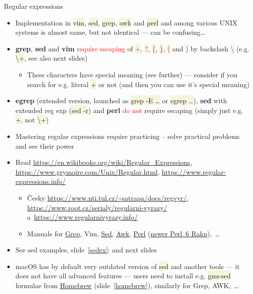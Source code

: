 \documentclass[compress, xelatex, 11pt, xcolor=svgnames, aspectratio=169,
	hyperref={
		bookmarks=true,
		unicode=true,
		colorlinks=true,
		pdftitle={Linux, command line and MetaCentrum},
		plainpages=false,
		pdfauthor={Vojtech Zeisek},
		pdfsubject={Course about use of Linux command line, writing shell scripts and using MetaCentrum of CESNET},
		pdfcreator={XeLaTeX},
		pdfkeywords={Linux, GNU, BASH, shell, command line, MetaCentrum},
		linkcolor=DarkRed, %
		anchorcolor=DarkBlue, %
		citecolor=Indigo, %
		filecolor=NavyBlue, %
		menucolor=DarkMagenta, %
		urlcolor=DarkBlue, %
		},
	url={hyphens, lowtilde} %
	]{beamer}
\renewcommand{\texttt}[1]{\colorbox{Beige}{{\ttfamily #1}}}
\renewcommand{\alert}[1]{\textcolor{red}{#1}}
\begin{document}
\begin{frame}[allowframebreaks]{Regular expressions}
	\label{regexp}
	\begin{itemize}
		\item Implementation in \texttt{vim}, \texttt{sed}, \texttt{grep}, \texttt{awk} and \texttt{perl} and among various UNIX systems is almost same, but not identical --- can be confusing\ldots
		\item \textbf{grep}, \textbf{sed} and \textbf{vim} \alert{require escaping} of \alert{\texttt{+}}, \alert{\texttt{?}}, \alert{\texttt{\{}}, \alert{\texttt{\}}}, \alert{\texttt{(}} and \alert{\texttt{)}} by backslash \alert{\texttt{\textbackslash}} (e.g. \texttt{\textbackslash +}, see also next slides)
		\begin{itemize}
			\item These characters have special meaning (see further) --- consider if you search for e.g. literal \texttt{+} or not (and then you can use it's special meaning)
		\end{itemize}
		\item \textbf{egrep} (extended version, launched as \texttt{grep -E \ldots} or \texttt{egrep \ldots}), \textbf{sed} with extended reg exp (\texttt{sed -r}) and \textbf{perl} \alert{do not} require escaping (simply just e.g. \texttt{+}, not \texttt{\textbackslash +})
		\item Mastering regular expressions require practicing -- solve practical problems and see their power
		\item Read \url{https://en.wikibooks.org/wiki/Regular_Expressions}, \url{https://www.grymoire.com/Unix/Regular.html}, \url{https://www.regular-expressions.info/}
		\begin{itemize}
			\item Česky \url{https://www.nti.tul.cz/~satrapa/docs/regvyr/}, \url{https://www.root.cz/serialy/regularni-vyrazy/} a~\url{https://www.regularnivyrazy.info/}
			\item Manuals for \href{https://www.gnu.org/software/grep/manual/}{Grep}, Vim, \href{https://www.gnu.org/software/sed/manual/}{Sed}, \href{https://www.gnu.org/software/gawk/manual/}{Awk}, \href{https://en.wikibooks.org/wiki/Perl_Programming}{Perl} (\href{https://en.wikibooks.org/wiki/Raku_Programming}{newer Perl~6 Raku}),~\ldots
		\end{itemize}
		\item See sed examples, slide~\ref{sedex}; and next slides
		\item macOS has by default very outdated version of \texttt{sed} and another tools --- it does not have all advanced features --- users need to install e.g. \texttt{gnu-sed} formulae from \href{https://brew.sh/}{Homebrew} (slide~\ref{homebrew}), similarly for Grep, AWK,~\ldots

\end{itemize}
\end{frame}
\end{document}
